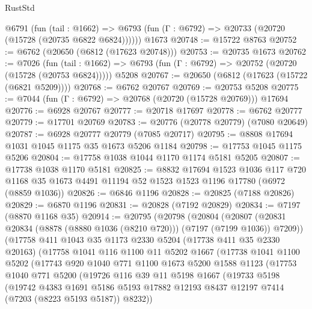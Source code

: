 \begin{lexlean}{RustStd}
\begin{coremodule}
    @6791
      (fun (tail : @1662) =>
      @6793 (fun (Γ : @6792) => @20733 (@20720 (@15728 (@20735 @6822 @6824))))))
    @1673
@20748 := @15722 @8763
@20752 := @6762 (@20650 (@6812 (@17623 @20748)))
@20753 := @20735 @1673
@20762 := @7026
    (fun (tail : @1662) => @6793 (fun (Γ : @6792) => @20752 (@20720 (@15728 (@20753 @6824)))))
    @5208
@20767 := @20650 (@6812 (@17623 (@15722 (@6821 @5209))))
@20768 := @6762 @20767
@20769 := @20753 @5208
@20775 := @7044 (fun (Γ : @6792) => @20768 (@20720 (@15728 @20769))) @17694
@20776 := @6928 @20767
@20777 := @20718 @17697
@20778 := @6762 @20777
@20779 := @17701 @20769
@20783 := @20776 (@20778 @20779) (@7080 @20649)
@20787 := @6928 @20777 @20779 (@7085 @20717)
@20795 := @8808 @17694 @1031 @1045 @1175 @35 @1673 @5206 @1184
@20798 := @17753 @1045 @1175 @5206
@20804 := @17758 @1038 @1044 @1170 @1174 @5181 @5205
@20807 := @17738 @1038 @1170 @5181
@20825 := @8832
    @17694
    @1523
    @1036
    @117
    @720
    @1168
    @35
    @1673
    @4491
    @11194
    @52
    @1523
    @1523
    @1196
    @17780
    (@6972 (@8859 @1036))
@20826 := @6846 @1196
@20828 := @20825 (@7188 @20826)
@20829 := @6870 @1196
@20831 := @20828 (@7192 @20829)
@20834 := @7197 (@8870 @1168 @35)
@20914 := @20795
    (@20798
      (@20804
        (@20807 (@20831 @20834 (@8878 (@8880 @1036 (@8210 @720))) (@7197 (@7199 @1036)) @7209))
        (@17758
          @411
          @1043
          @35
          @1173
          @2330
          @5204
          (@17738 @411 @35 @2330 @20163)
          (@17758
            @1041
            @116
            @1100
            @11
            @5202
            @1667
            (@17738
              @1041
              @1100
              @5202
              (@17743
                @920
                @1040
                @771
                @1100
                @1673
                @5200
                @1588
                @1123
                (@17753
                  @1040
                  @771
                  @5200
                  (@19726
                    @116
                    @39
                    @11
                    @5198
                    @1667
                    (@19733
                      @5198
                      (@19742
                        @4383
                        @1691
                        @5186
                        @5193
                        @17882
                        @12193
                        @8437
                        @12197
                        @7414
                        (@7203 (@8223 @5193 @5187))
                        @8232))

\end{coremodule}
\end{lexlean}
